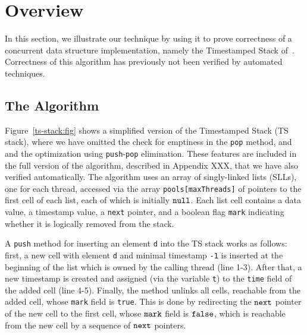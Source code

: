 \section{Overview}
\label{sec:overview}

In this section, we illustrate our technique by using it to prove correctness of
a concurrent data structure implementation, namely the Timestamped Stack
of~\cite{ts-stack}. Correctness of this algorithm has previously not been
verified by automated techniques.

\subsection{The Algorithm}



Figure~\ref{ts-stack:fig} shows a simplified version of the Timestamped Stack (TS stack), where we have omitted the check for emptiness in the {\tt pop} method, and and the optimization using {\tt push}-{\tt pop} elimination. These features are included in the full version of the algorithm, described in Appendix XXX, that we have also verified automatically. The algorithm uses an array of singly-linked lists (SLLs), one for each thread, accessed via the array {\tt pools[maxThreads]} of pointers to the first cell of each list, each of which is initially ${\tt null}$. Each list cell contains a data value, a timestamp value, a {\tt next} pointer, and a boolean flag {\tt mark} indicating whether it is logically removed from the stack.

A {\tt push} method for inserting an element {\tt d} into the TS stack works as follows: first, a new cell with element {\tt d} and minimal timestamp {\tt -1} is inserted at the beginning of the list which is owned by the calling thread (line 1-3). After that, a new timestamp is created and assigned (via the variable {\tt t}) to the {\tt time} field of the added cell (line 4-5).
Finally, the method unlinks all cells, reachable from the added cell, whose {\tt mark} field is {\tt true}. This is done by redirecting the $\tt next$ pointer of the new cell to the first cell, whose $\tt mark$ field is $\tt false$, which is
reachable from the new cell by a sequence of $\tt next$ pointers.

